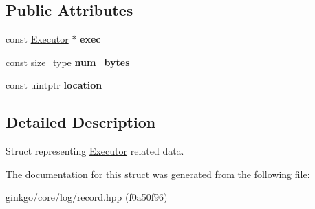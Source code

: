 \subsection*{Public Attributes}
\begin{DoxyCompactItemize}
\item 
\mbox{\label{structgko_1_1log_1_1executor__data_af2abfc8622da8be8466de15db9c15f82}} 
const \hyperlink{classgko_1_1Executor}{Executor} $\ast$ {\bfseries exec}
\item 
\mbox{\label{structgko_1_1log_1_1executor__data_ae163391b85c824367dd0c7e4771ac8c9}} 
const \hyperlink{namespacegko_a6e5c95df0ae4e47aab2f604a22d98ee7}{size\+\_\+type} {\bfseries num\+\_\+bytes}
\item 
\mbox{\label{structgko_1_1log_1_1executor__data_a5ff784e87bb40d732118a9bd77457ebe}} 
const uintptr {\bfseries location}
\end{DoxyCompactItemize}


\subsection{Detailed Description}
Struct representing \hyperlink{classgko_1_1Executor}{Executor} related data. 

The documentation for this struct was generated from the following file\+:\begin{DoxyCompactItemize}
\item 
ginkgo/core/log/record.\+hpp (f0a50f96)\end{DoxyCompactItemize}
